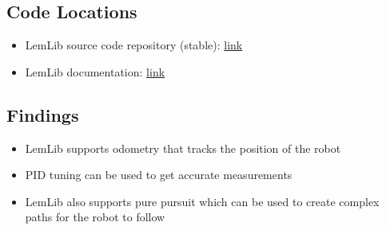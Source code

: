 \subsection*{Code Locations}
\begin{itemize}
    \item LemLib source code repository (stable): \href{https://github.com/LemLib/LemLib/tree/stable/}{link}
    \item LemLib documentation: \href{https://lemlib.readthedocs.io/en/stable/}{link}
\end{itemize}

\subsection*{Findings}
\begin{itemize}
    \item LemLib supports odometry that tracks the position of the robot
    \item PID tuning can be used to get accurate measurements
    \item LemLib also supports pure pursuit which can be used to create complex paths for the robot to follow
\end{itemize}

